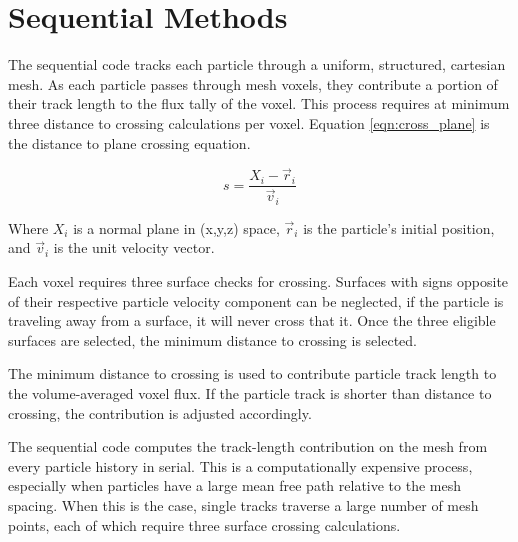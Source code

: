 \section{Sequential Methods}
The sequential code tracks each particle through a uniform, structured,
cartesian mesh. As each particle passes through mesh voxels, they contribute a
portion of their track length to the flux tally of the voxel. This process
requires at minimum three distance to crossing calculations per voxel. Equation
\ref{eqn:cross_plane} is the distance to plane crossing equation.

\begin{equation}
\label{eqn:cross_plane}
s = \frac{X_i - \vec{r}_i}{\vec{v}_i}
\end{equation}

Where $X_i$ is a normal plane in (x,y,z) space, $\vec{r}_i$ is the particle's
initial position, and $\vec{v}_i$ is the unit velocity vector.

Each voxel requires three surface checks for crossing. Surfaces with
signs opposite of their respective particle velocity component can be neglected,
if the particle is traveling away from a surface, it will never cross that it.
Once the three eligible surfaces are selected, the minimum distance to crossing
is selected. 

The minimum distance to crossing is used to contribute particle track length to
the volume-averaged voxel flux. If the particle track is shorter than distance
to crossing, the contribution is adjusted accordingly.

The sequential code computes the track-length contribution on the mesh from
every particle history in serial. This is a computationally expensive process,
especially when particles have a large mean free path relative to the mesh
spacing. When this is the case, single tracks traverse a large number of mesh
points, each of which require three surface crossing calculations.


